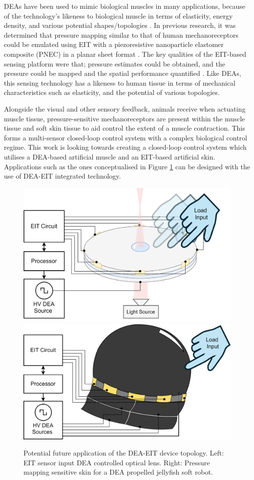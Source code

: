 DEAs have been used to mimic biological muscles in many applications, because of the technology's likeness to biological muscle in terms of elasticity, energy density, and various potential shapes/topologies \cite{Rosset2016, Hajiesmaili2021, Guo2021} . In previous research, it was determined that pressure mapping similar to that of human mechanoreceptors could be emulated using EIT with a piezoresistive nanoparticle elastomer composite (PNEC) in a planar sheet format\cite{Ellingham2022} . The key qualities of the EIT-based sensing platform were that; pressure estimates could be obtained, and the pressure could be mapped and the spatial performance quantified\cite{Ellingham2024} . Like DEAs, this sensing technology has a likeness to human tissue in terms of mechanical characteristics such as elasticity, and the potential of various topologies.

Alongside the visual and other sensory feedback, animals receive when actuating muscle tissue, pressure-sensitive mechanoreceptors are present within the muscle tissue and soft skin tissue to aid control the extent of a muscle contraction. This forms a multi-sensor closed-loop control system with a complex biological control regime. This work is looking towards creating a closed-loop control system which utilises a DEA-based artificial muscle and an EIT-based artificial skin. Applications such as the ones conceptualised in Figure \ref{fig:dea-eit-applications} can be designed with the use of DEA-EIT integrated technology.

\begin{figure}[H]
	\centering
	\includegraphics[width=0.41\linewidth]{Figures/DEA-EIT_lens_application_lit.png}
	\hspace{1cm}
	\includegraphics[width=0.44\linewidth]{Figures/DEA-EIT_jellyfish_application.png}
	\vspace{0.3cm}
	\caption{Potential future application of the DEA-EIT device topology. Left: EIT sensor input DEA controlled optical lens. Right: Pressure mapping sensitive skin for a DEA propelled jellyfish soft robot.}
	\label{fig:dea-eit-applications}
\end{figure}


